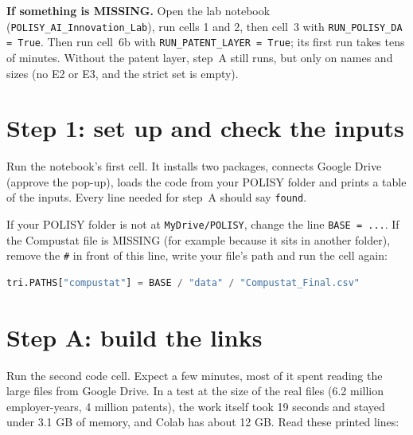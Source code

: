 \documentclass[11pt,a4paper]{article}
\newcommand{\file}[1]{\texttt{#1}}
\begin{document}
\textbf{If something is MISSING.} Open the lab notebook (\file{POLISY\_AI\_Innovation\_Lab}), run cells 1 and 2, then cell~3 with \texttt{RUN\_POLISY\_DA = True}. Then run cell~6b with \texttt{RUN\_PATENT\_LAYER = True}; its first run takes tens of minutes. Without the patent layer, step~A still runs, but only on names and sizes (no E2 or E3, and the strict set is empty).

\section{Step 1: set up and check the inputs}\label{sec:setup}

Run the notebook's first cell. It installs two packages, connects Google Drive (approve the pop-up), loads the code from your POLISY folder and prints a table of the inputs. Every line needed for step~A should say \texttt{found}.

If your POLISY folder is not at \file{MyDrive/POLISY}, change the line \texttt{BASE = ...}. If the Compustat file is MISSING (for example because it sits in another folder), remove the \texttt{\#} in front of this line, write your file's path and run the cell again:
\begin{lstlisting}[language=Python]
tri.PATHS["compustat"] = BASE / "data" / "Compustat_Final.csv"
\end{lstlisting}

\section{Step A: build the links}\label{sec:build}

Run the second code cell. Expect a few minutes, most of it spent reading the large files from Google Drive. In a test at the size of the real files (6.2 million employer-years, 4 million patents), the work itself took 19 seconds and stayed under 3.1 GB of memory, and Colab has about 12 GB. Read these printed lines:
\end{document}
